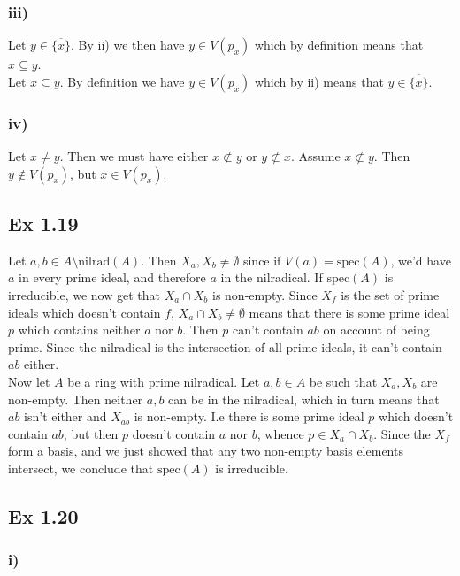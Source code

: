 \documentclass{article}
\theoremstyle{definition}
\newcommand{\nr}{\text{nilrad}}
\newcommand{\spec}{\text{spec}}
\begin{document}
\subsubsection*{iii)}
Let $y \in \overline{\{x\}}$. By ii) we then have $y \in V(p_x)$ which by definition means that $x \subseteq y$. \\

Let $x \subseteq y$. By definition we have $y \in V(p_x)$ which by ii) means
that $y \in \overline{\{x\}}$.

\subsubsection*{iv)}
Let $x \not = y$. Then we must have either $x \not \subset y$ or $y \not \subset x$. Assume $x \not \subset y$. Then $y \not \in V(p_x)$, but $x \in V(p_x)$.

\subsection*{Ex 1.19}
Let $a, b\in A \setminus \nr(A)$. Then $X_a, X_b \not = \emptyset$ since if
$V(a) = \spec(A)$, we'd have $a$ in every prime ideal, and therefore $a$ in the
nilradical. If $\spec(A)$ is irreducible, we now get that $X_a \cap X_b$ is
non-empty. Since $X_f$ is the set of prime ideals which doesn't contain $f$,
$X_a \cap X_b \not = \emptyset$ means that there is some prime ideal $p$ which
contains neither $a$ nor $b$. Then $p$ can't contain $ab$ on account of being
prime. Since the nilradical is the intersection of all prime ideals, it can't
contain $ab$ either. \\

Now let $A$ be a ring with prime nilradical. Let $a, b \in A$ be such that
$X_a, X_b$ are non-empty. Then neither $a, b$ can be in the nilradical, which
in turn means that $ab$ isn't either and $X_{ab}$ is non-empty. I.e there is
some prime ideal $p$ which doesn't contain $ab$, but then $p$ doesn't contain
$a$ nor $b$, whence $p \in X_a \cap X_b$. Since the $X_f$ form a basis, and we
just showed that any two non-empty basis elements intersect, we conclude that
$\spec(A)$ is irreducible.

\subsection*{Ex 1.20}
\subsubsection*{i)}
\end{document}
